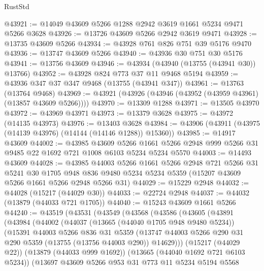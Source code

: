 \begin{lexlean}{RustStd}
\begin{coremodule}
@43921 := @14049 @43609 @5266 @1288 @2942 @3619 @1661 @5234 @9471 @5266 @3628
@43926 := @13726 @43609 @5266 @2942 @3619 @9471
@43928 := @13735 @43609 @5266
@43934 := @43928 @761 @826 @751 @39 @5176 @9470
@43936 := @13747 @43609 @5266
@43940 := @43936 @30 @751 @30 @5176
@43941 := @13756 @43609
@43946 := @43934 (@43940 (@13755 (@43941 @30)) @13766)
@43952 := @43928 @824 @773 @37 @11 @9468 @5194
@43959 := @43936 @347 @37 @347 @9468 (@13755 (@43941 @347))
@43961 := @13763 (@13764 @9468)
@43969 := @43921 (@43926 (@43946 (@43952 (@43959 @43961) (@13857 @43609 @5266))))
@43970 := @13309 @1288
@43971 := @13505 @43970
@43972 := @43969 @43971
@43973 := @13379 @3628
@43975 := @43972 (@14135 @43973)
@43976 := @13403 @3628
@43984 := @43906 (@43911 (@43975 (@14139 @43976) (@14144 (@14146 @1288)) @15360))
@43985 := @14917 @43609
@44002 := @43985
    @43609
    @5266
    @1661
    @5266
    @2948
    @999
    @5266
    @31
    @9485
    @22
    @1692
    @721
    @1008
    @6103
    @5234
    @5234
    @5570
@44003 := @14493 @43609
@44028 := @43985
    @44003
    @5266
    @1661
    @5266
    @2948
    @721
    @5266
    @31
    @5241
    @30
    @1705
    @948
    @836
    @9480
    @5234
    @5234
    @5359
    (@15207 @43609 @5266 @1661 @5266 @2948 @5266 @31)
@44029 := @15229 @2948
@44032 := @44028 (@15217 (@44029 @30))
@44033 := @22724 @2948
@44037 := @44032 (@13879 (@44033 @721 @1705))
@44040 := @15243 @43609 @1661 @5266
@44240 := @43519
    (@43531
      (@43549
        (@43568
          (@43586
            (@43605
              (@43891
                (@43984
                  (@44002
                    (@44037
                      (@13665 (@44040 @1705 @948 @9480 @5234))
                      (@15391
                        @44003
                        @5266
                        @836
                        @31
                        @5359
                        (@13747
                          @44003
                          @5266
                          @290
                          @31
                          @290
                          @5359
                          (@13755 (@13756 @44003 @290))
                          @14629)))
                    (@15217 (@44029 @22))
                    (@13879 (@44033 @999 @1692))
                    (@13665 (@44040 @1692 @721 @6103 @5234))
                    (@13697
                      @43609
                      @5266
                      @953
                      @31
                      @773
                      @11
                      @5234
                      @5194
                      @5568

\end{coremodule}
\end{lexlean}
